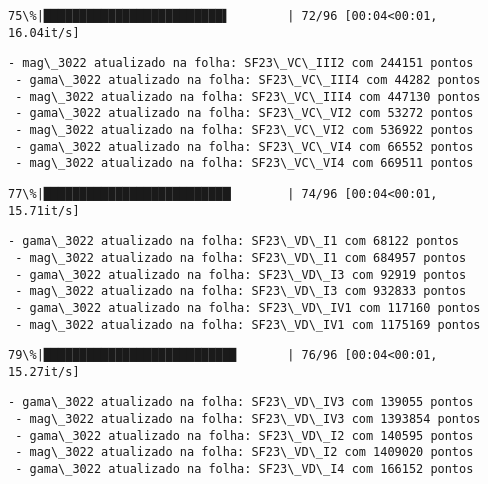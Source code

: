 \documentclass[11pt]{article}
\begin{document}
    \begin{Verbatim}[commandchars=\\\{\}]
 75\%|█████████████████████████▌        | 72/96 [00:04<00:01, 16.04it/s]
    \end{Verbatim}

    \begin{Verbatim}[commandchars=\\\{\}]
 - mag\_3022 atualizado na folha: SF23\_VC\_III2 com 244151 pontos
 - gama\_3022 atualizado na folha: SF23\_VC\_III4 com 44282 pontos
 - mag\_3022 atualizado na folha: SF23\_VC\_III4 com 447130 pontos
 - gama\_3022 atualizado na folha: SF23\_VC\_VI2 com 53272 pontos
 - mag\_3022 atualizado na folha: SF23\_VC\_VI2 com 536922 pontos
 - gama\_3022 atualizado na folha: SF23\_VC\_VI4 com 66552 pontos
 - mag\_3022 atualizado na folha: SF23\_VC\_VI4 com 669511 pontos
    \end{Verbatim}

    \begin{Verbatim}[commandchars=\\\{\}]
 77\%|██████████████████████████▏       | 74/96 [00:04<00:01, 15.71it/s]
    \end{Verbatim}

    \begin{Verbatim}[commandchars=\\\{\}]
 - gama\_3022 atualizado na folha: SF23\_VD\_I1 com 68122 pontos
 - mag\_3022 atualizado na folha: SF23\_VD\_I1 com 684957 pontos
 - gama\_3022 atualizado na folha: SF23\_VD\_I3 com 92919 pontos
 - mag\_3022 atualizado na folha: SF23\_VD\_I3 com 932833 pontos
 - gama\_3022 atualizado na folha: SF23\_VD\_IV1 com 117160 pontos
 - mag\_3022 atualizado na folha: SF23\_VD\_IV1 com 1175169 pontos
    \end{Verbatim}

    \begin{Verbatim}[commandchars=\\\{\}]
 79\%|██████████████████████████▉       | 76/96 [00:04<00:01, 15.27it/s]
    \end{Verbatim}

    \begin{Verbatim}[commandchars=\\\{\}]
 - gama\_3022 atualizado na folha: SF23\_VD\_IV3 com 139055 pontos
 - mag\_3022 atualizado na folha: SF23\_VD\_IV3 com 1393854 pontos
 - gama\_3022 atualizado na folha: SF23\_VD\_I2 com 140595 pontos
 - mag\_3022 atualizado na folha: SF23\_VD\_I2 com 1409020 pontos
 - gama\_3022 atualizado na folha: SF23\_VD\_I4 com 166152 pontos
    \end{Verbatim}
\end{document}
